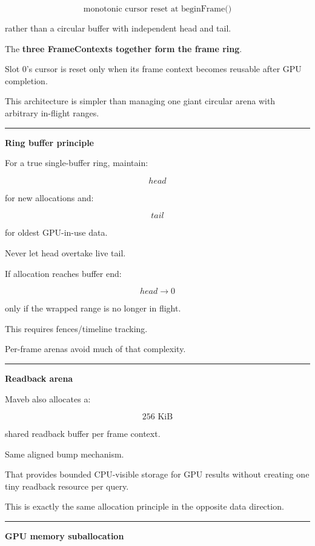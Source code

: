 \[
\boxed{
\text{monotonic cursor reset at beginFrame()}
}
\]

rather than a circular buffer with independent head and tail.

The \textbf{three FrameContexts together form the frame ring}.

Slot 0's cursor is reset only when its frame context becomes reusable after GPU completion.

This architecture is simpler than managing one giant circular arena with arbitrary in-flight ranges.

\begin{center}\rule{0.5\linewidth}{0.5pt}\end{center}

\textbf{Ring buffer principle}

For a true single-buffer ring, maintain:

\[
head
\]

for new allocations and:

\[
tail
\]

for oldest GPU-in-use data.

Never let head overtake live tail.

If allocation reaches buffer end:

\[
head\rightarrow0
\]

only if the wrapped range is no longer in flight.

This requires fences/timeline tracking.

Per-frame arenas avoid much of that complexity.

\begin{center}\rule{0.5\linewidth}{0.5pt}\end{center}

\textbf{Readback arena}

Maveb also allocates a:

\[
256\text{ KiB}
\]

shared readback buffer per frame context.

Same aligned bump mechanism.

That provides bounded CPU-visible storage for GPU results without creating one tiny readback resource per query.

This is exactly the same allocation principle in the opposite data direction.

\begin{center}\rule{0.5\linewidth}{0.5pt}\end{center}

\textbf{GPU memory suballocation}

